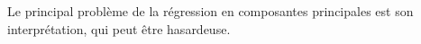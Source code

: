 Le principal problème de la régression en composantes principales est son interprétation, qui peut être hasardeuse. %

%

